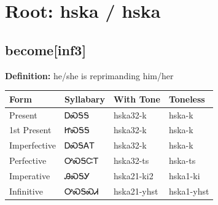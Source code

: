 \documentclass{article}%
\begin{document}
%
\normalsize%
\section*{Root: hska / hska}%
\subsection*{become[inf3]}%
\textbf{Definition: }%
he/she is reprimanding him/her%
\\[0.5em]%
\begin{tabular}{|l|l|l|l|}%
\hline%
\textbf{Form}&\textbf{Syllabary}&\textbf{With Tone}&\textbf{Toneless}\\%
\hline%
Present&ᎠᏍᎦᎦ&hska32{-}k&hska{-}k\\%
1st Present&ᏥᏍᎦᎦ&hska32{-}k&hska{-}k\\%
Imperfective&ᎠᏍᎦᎪᎢ&hska32{-}k&hska{-}k\\%
Perfective&ᎤᏍᎦᏨᎢ&hska32{-}ts&hska{-}ts\\%
Imperative&ᎯᏍᎦᎩ&hska21{-}ki2&hska1{-}ki\\%
Infinitive&ᎤᏍᎦᏍᏗ&hska21{-}yhst&hska1{-}yhst\\%
\hline%
\end{tabular}%
\\[1em]%
\end{document}
